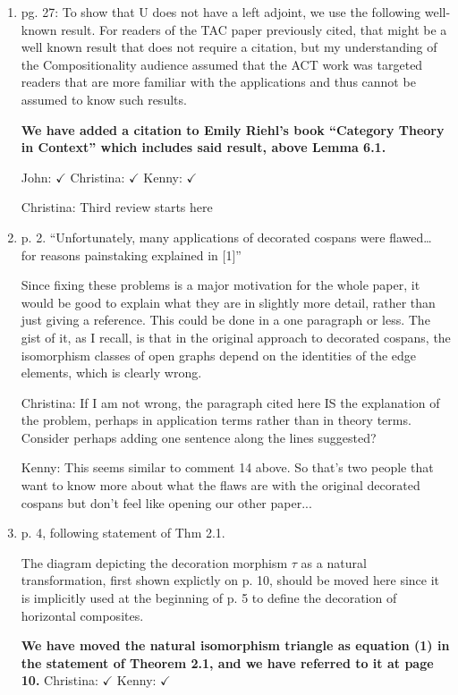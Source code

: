 \documentclass[reqno]{amsart}
\def\chris{\color{purple} Christina: }
\def\john{\color{red} John: }
\def\kenny{\color{blue} Kenny: }
\begin{document}
\begin{enumerate}
\item pg. 27: To show that U does not have a left adjoint, we use the following well-known result. For readers of the TAC paper previously cited, 
that might 
be a well known result that does not require a citation, but my understanding of the Compositionality audience assumed that the ACT work was targeted 
readers that are more familiar with the applications and thus cannot be assumed to know such results.

{\bf We have added a citation to Emily Riehl's book ``Category Theory in Context'' which includes said result, above Lemma 6.1.}  


{\john $\checkmark$} {\chris $\checkmark$} {\kenny $\checkmark$}

{\chris Third review starts here}
\item p. 2. “Unfortunately, many applications of decorated cospans were flawed… for reasons painstaking explained in [1]”

Since fixing these problems is a major motivation for the whole paper, it would be good to explain what they are in slightly more detail, rather than 
just giving a reference. This could be done in a one paragraph or less. The gist of it, as I recall, is that in the original approach to decorated 
cospans, the isomorphism classes of open graphs depend on the identities of the edge elements, which is clearly wrong.

{\chris If I am not wrong, the paragraph cited here IS the explanation of the problem, perhaps in application terms rather than in theory terms. 
Consider perhaps adding one sentence along the lines suggested?}

{\kenny This seems similar to comment 14 above. So that's two people that want to know more about what the flaws are with the original decorated cospans but don't feel like opening our other paper...}

\item p. 4, following statement of Thm 2.1.

The diagram depicting the decoration morphism $\tau$ as a natural transformation, first shown explictly on p. 10, should be moved here since it is 
implicitly used at the beginning of p. 5 to define the decoration of horizontal composites.

{\bf We have moved the natural isomorphism triangle as equation (1) in the statement of Theorem 2.1, and we have referred to it at page 10.} {\chris 
$\checkmark$} {\kenny $\checkmark$}


\end{enumerate}
\end{document}

